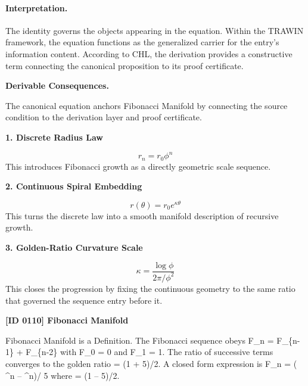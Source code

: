 \paragraph{Interpretation.}
The identity governs the objects appearing in the equation. Within the TRAWIN framework, the equation functions as the generalized carrier for the entry’s information content. According to CHL, the derivation provides a constructive term connecting the canonical proposition to its proof certificate.

\par\vspace{0.35em}
\noindent\textbf{Derivable Consequences.}\quad
\begingroup
\footnotesize
\raggedright
The canonical equation anchors Fibonacci Manifold by connecting the source condition to the derivation layer and proof certificate.
\par\endgroup

\noindent\textbf{1. Discrete Radius Law}\par
\[
r_n = r_0 \phi^n
\]
\noindent This introduces Fibonacci growth as a directly geometric scale sequence.\par
\noindent\textbf{2. Continuous Spiral Embedding}\par
\[
r(\theta)= r_0 e^{\kappa \theta}
\]
\noindent This turns the discrete law into a smooth manifold description of recursive growth.\par
\noindent\textbf{3. Golden-Ratio Curvature Scale}\par
\[
\kappa = \frac{\log \phi}{2\pi/\phi^2}
\]
\noindent This closes the progression by fixing the continuous geometry to the same ratio that governed the sequence entry before it.\par

\clearpage
\noindent\textbf{[ID 0110] Fibonacci Manifold}\par
\vspace{0.35em}
\begingroup\small
{}
Fibonacci Manifold is a Definition. The Fibonacci sequence obeys F\_n = F\_\{n-1\} + F\_\{n-2\} with F\_0 = 0 and F\_1 = 1. The ratio of successive terms converges to the golden ratio   = (1 +  5)/2. A closed form expression is F\_n = ( \textasciicircum{}n --  \textasciicircum{}n)/ 5 where   = (1 --  5)/2.

